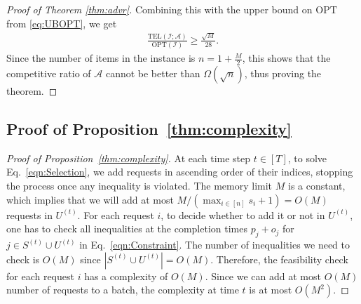 \documentclass[11pt, a4paper]{article}
\theoremstyle{plain}
\theoremstyle{definition}
\theoremstyle{remark}
\newcommand{\cA}{\mathcal{A}}
\newcommand{\cI}{\mathcal{I}}
\newcommand{\OPT}{\text{OPT}}
\begin{document}
\begin{proof}[Proof of Theorem \ref{thm:advr}]
    Combining this with the upper bound on $\OPT$ from \eqref{eq:UBOPT}, we get
    \begin{align*}
 \frac{ \text{TEL}(\cI; \mathcal{A})}{\text{OPT}(\mathcal{I})} \ge \frac{\sqrt{M}}{28}.
    \end{align*}
    Since the number of items in the instance is $n = 1 + \frac{M}{2}$, this shows that the competitive ratio of $\cA$ cannot be better than $\Omega(\sqrt{n})$, thus proving the theorem.      
\end{proof}


\subsection{Proof of Proposition~\ref{thm:complexity}}

\begin{proof}[Proof of Proposition~\ref{thm:complexity}]
At each time step $t \in [T]$, to solve Eq.~\eqref{eqn:Selection}, we add requests in ascending order of their indices, stopping the process once any inequality is violated. The memory limit $M$ is a constant, which implies that we will add at most $M/(\max_{i \in [n]}s_i+1)=O(M)$ requests in $U^{(t)}$. For each request $i$, to decide whether to add it or not in $U^{(t)}$, one has to check all inequalities at the completion times $p_j+o_j$ for $j \in S^{(t)} \cup U^{(t)}$ in Eq.~\eqref{eqn:Constraint}. The number of inequalities we need to check is $O(M)$ since $|S^{(t)} \cup U^{(t)}|=O(M)$. Therefore, the feasibility check for each request $i$ has a complexity of $O(M)$. Since we can add at most $O(M)$ number of requests to a batch, the complexity at time $t$ is at most $O(M^2)$.
\end{proof}

\end{document}
